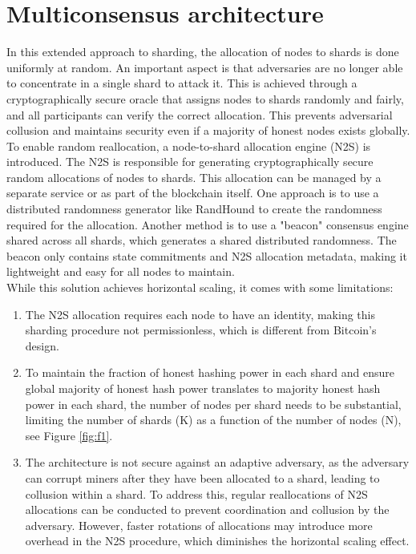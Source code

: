 \documentclass{report}
\begin{document}
\section{Multiconsensus architecture} 
In this extended approach to sharding, the allocation of nodes to shards is done uniformly at random. An important aspect is that adversaries are no longer able to concentrate in a single shard to attack it. This is achieved through a cryptographically secure oracle that assigns nodes to shards randomly and fairly, and all participants can verify the correct allocation. This prevents adversarial collusion and maintains security even if a majority of honest nodes exists globally.\\
To enable random reallocation, a node-to-shard allocation engine (N2S) is introduced. The N2S is responsible for generating cryptographically secure random allocations of nodes to shards. This allocation can be managed by a separate service or as part of the blockchain itself. One approach is to use a distributed randomness generator like RandHound to create the randomness required for the allocation. Another method is to use a "beacon" consensus engine shared across all shards, which generates a shared distributed randomness. The beacon only contains state commitments and N2S allocation metadata, making it lightweight and easy for all nodes to maintain.\\
While this solution achieves horizontal scaling, it comes with some limitations:
\begin{enumerate}
	\item The N2S allocation requires each node to have an identity, making this sharding procedure not permissionless, which is different from Bitcoin's design.
	\item To maintain the fraction of honest hashing power in each shard and ensure global majority of honest hash power translates to majority honest hash power in each shard, the number of nodes per shard needs to be substantial, limiting the number of shards (K) as a function of the number of nodes (N), see Figure \ref{fig:f1}.
	\item The architecture is not secure against an adaptive adversary, as the adversary can corrupt miners after they have been allocated to a shard, leading to collusion within a shard. To address this, regular reallocations of N2S allocations can be conducted to prevent coordination and collusion by the adversary. However, faster rotations of allocations may introduce more overhead in the N2S procedure, which diminishes the horizontal scaling effect.
\end{enumerate}
\end{document}
